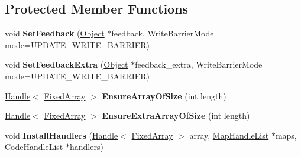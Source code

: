 \subsection*{Protected Member Functions}
\begin{DoxyCompactItemize}
\item 
void {\bfseries Set\+Feedback} (\hyperlink{classv8_1_1internal_1_1_object}{Object} $\ast$feedback, Write\+Barrier\+Mode mode=U\+P\+D\+A\+T\+E\+\_\+\+W\+R\+I\+T\+E\+\_\+\+B\+A\+R\+R\+I\+ER)\hypertarget{classv8_1_1internal_1_1_feedback_nexus_a05374b1926bb62b14dfa93770de242f8}{}\label{classv8_1_1internal_1_1_feedback_nexus_a05374b1926bb62b14dfa93770de242f8}

\item 
void {\bfseries Set\+Feedback\+Extra} (\hyperlink{classv8_1_1internal_1_1_object}{Object} $\ast$feedback\+\_\+extra, Write\+Barrier\+Mode mode=U\+P\+D\+A\+T\+E\+\_\+\+W\+R\+I\+T\+E\+\_\+\+B\+A\+R\+R\+I\+ER)\hypertarget{classv8_1_1internal_1_1_feedback_nexus_aede01d24ca8298dfc4b8b4aaafbef723}{}\label{classv8_1_1internal_1_1_feedback_nexus_aede01d24ca8298dfc4b8b4aaafbef723}

\item 
\hyperlink{classv8_1_1internal_1_1_handle}{Handle}$<$ \hyperlink{classv8_1_1internal_1_1_fixed_array}{Fixed\+Array} $>$ {\bfseries Ensure\+Array\+Of\+Size} (int length)\hypertarget{classv8_1_1internal_1_1_feedback_nexus_a733b100758be069b16bbed0ae2a0b304}{}\label{classv8_1_1internal_1_1_feedback_nexus_a733b100758be069b16bbed0ae2a0b304}

\item 
\hyperlink{classv8_1_1internal_1_1_handle}{Handle}$<$ \hyperlink{classv8_1_1internal_1_1_fixed_array}{Fixed\+Array} $>$ {\bfseries Ensure\+Extra\+Array\+Of\+Size} (int length)\hypertarget{classv8_1_1internal_1_1_feedback_nexus_a1c3a7e4a31ddb9f8f193050e3cf07434}{}\label{classv8_1_1internal_1_1_feedback_nexus_a1c3a7e4a31ddb9f8f193050e3cf07434}

\item 
void {\bfseries Install\+Handlers} (\hyperlink{classv8_1_1internal_1_1_handle}{Handle}$<$ \hyperlink{classv8_1_1internal_1_1_fixed_array}{Fixed\+Array} $>$ array, \hyperlink{classv8_1_1internal_1_1_list}{Map\+Handle\+List} $\ast$maps, \hyperlink{classv8_1_1internal_1_1_list}{Code\+Handle\+List} $\ast$handlers)\hypertarget{classv8_1_1internal_1_1_feedback_nexus_a301d738260340e2e3889fd31f1a434d1}{}\label{classv8_1_1internal_1_1_feedback_nexus_a301d738260340e2e3889fd31f1a434d1}

\end{DoxyCompactItemize}
